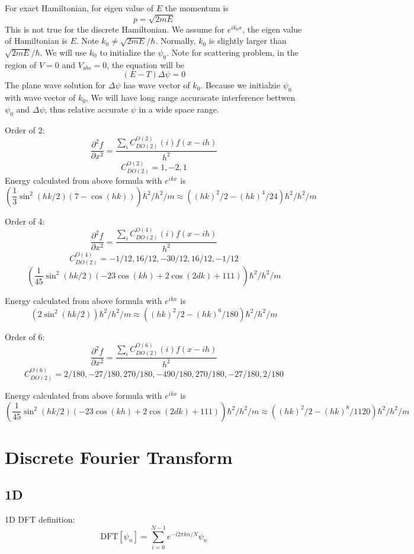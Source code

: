 \documentclass[12pt,twoside]{article}
\begin{document}
For exact Hamiltonian, for eigen value of $E$ the momentum is 
$$
p = \sqrt{2 m E}
$$
This is not true for the discrete Hamiltonian.
We assume for $e^{ik_0x}$, the eigen value of Hamiltonian is $E$.
Note $k_0 \neq \sqrt{2mE}/\hbar$.
Normally, $k_0$ is slightly larger than $\sqrt{2mE}/\hbar$.
We will use $k_0$ to initialize the $\psi_0$.
Note for scattering problem, in the region of $V=0$ and $V_{abs}=0$, the equation will be
$$
(E-T)\Delta\psi = 0
$$
The plane wave solution for $\Delta\psi$ has wave vector of $k_0$.
Because we initialzie $\psi_0$ with wave vector of $k_0$, We will have long range accuracate interference bettwen $\psi_0$ and $\Delta\psi$,
thus relative accurate $\psi$ in a wide space range.

Order of 2:
$$
\frac{\partial^2 f}{\partial x^2}
=
\frac{\sum_i C_{DO(2)}^{O(2)}(i) f(x - i h)}{h^2}
$$
$$
C_{DO(2)}^{O(2)} = 1,-2,1
$$
Energy calculated from above formula with $e^{i k x}$ is
$$
\left(\frac{1}{3} \sin^2(hk/2) (7 - \cos(hk))\right) \hbar^2 / h^2 /m
\approx ((hk)^2/2 - (hk)^4/24)  \hbar^2 / h^2 /m
$$


Order of 4:
$$
\frac{\partial^2 f}{\partial x^2}
=
\frac{\sum_i C_{DO(2)}^{O(4)}(i) f(x - i h)}{h^2}
$$
$$
C_{DO(2)}^{O(4)} = -1/12,16/12,-30/12,16/12,-1/12
$$
$$
\left(\frac{1}{45} \sin^2(hk/2) (-23 \cos(kh) + 2 \cos(2 d k) + 111)\right) \hbar^2 / h^2 /m
$$

Energy calculated from above formula with $e^{i k x}$ is
$$
\left( 2 \sin^2(hk/2) \right) \hbar^2 / h^2 /m
\approx ((hk)^2/2 - (hk)^6/180) \hbar^2 / h^2 /m
$$



Order of 6:
$$
\frac{\partial^2 f}{\partial x^2}
=
\frac{\sum_i C_{DO(2)}^{O(6)}(i) f(x - i h)}{h^2}
$$
$$
C_{DO(2)}^{O(6)} = 2/180,-27/180,270/180,-490/180,270/180,-27/180,2/180
$$

Energy calculated from above formula with $e^{i k x}$ is
$$
\left(\frac{1}{45} \sin^2(hk/2) (-23 \cos(kh) + 2 \cos(2 d k) + 111)\right) \hbar^2 / h^2 /m
\approx ((hk)^2/2 - (hk)^8/1120) \hbar^2 / h^2 /m
$$

\section{Discrete Fourier Transform}
\subsection{1D}
1D DFT definition:
$$
\text{DFT}[\psi_n] = \sum_{i=0}^{N-1} e^{-i2\pi k n/N} \psi_n
$$
\end{document}
